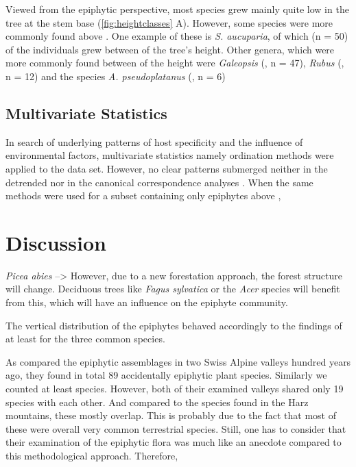 \documentclass[12pt, a4paper, oneside, draft]{article}
\begin{document}
		Viewed from the epiphytic perspective, most species grew mainly quite low in the tree at the stem base (\autoref{fig:heightclasses} A). However, some species were more commonly found above . One example of these is \textit{S. aucuparia}, of which  (n = 50) of the individuals grew between  of the tree's height. Other genera, which were more commonly found between  of the height were \textit{Galeopsis} (, n = 47), \textit{Rubus} (, n = 12) and the species \textit{A. pseudoplatanus} (, n = 6)
		
	\subsection{Multivariate Statistics}
	In search of underlying patterns of host specificity and the influence of environmental factors, multivariate statistics namely ordination methods were applied to the data set. However, no clear patterns submerged neither in the detrended nor in the canonical correspondence analyses . When the same methods were used for a subset containing only epiphytes above , 
	
	

\section{Discussion}
\textit{Picea abies} -->  However, due to a new forestation approach, the forest structure will change. Deciduous trees like \textit{Fagus sylvatica} or the  \textit{Acer} species will benefit from this, which will have an influence on the epiphyte community.

The vertical distribution of the epiphytes behaved accordingly to the findings of \textcite{Zotz2003} at least for the three common species.

 As \textcite[pp.~52]{Staeger1908} compared the epiphytic assemblages in two Swiss Alpine valleys hundred years ago, they found in total 89 accidentally epiphytic plant species. Similarly we counted at least  species. However, both of their examined valleys shared only 19 species with each other. And compared to the species found in the Harz mountains, these mostly overlap. This is probably due to the fact that most of these were overall very common terrestrial species. Still, one has to consider that their examination of the epiphytic flora was much like an anecdote compared to this methodological approach. Therefore, 
\end{document}

